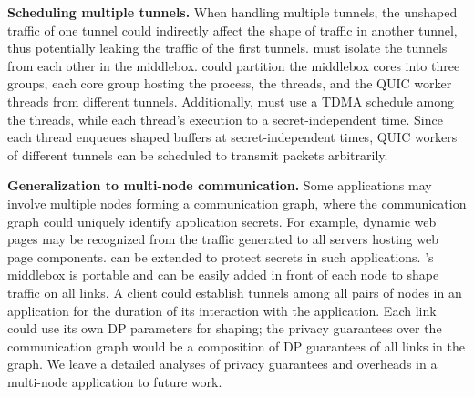 \textbf{Scheduling multiple tunnels.}
When handling multiple tunnels, the unshaped traffic of one tunnel could
indirectly affect the shape of traffic in another tunnel, thus potentially
leaking the traffic of the first tunnels.
{\sys} must isolate the tunnels from each other in the middlebox.
{\sys} could partition the middlebox cores into three groups, each core group
hosting the {\ushaper} process, the {\prepare} threads, and the QUIC worker
threads from different tunnels.
Additionally, {\sys} must use a TDMA schedule among the {\prepare} threads,
while  each thread's execution to a secret-independent time.
Since each {\prepare} thread enqueues shaped buffers at secret-independent
times, QUIC workers of different tunnels can be scheduled to transmit
packets arbitrarily.
%

\textbf{Generalization to multi-node communication.}
Some applications may involve multiple nodes forming a communication graph,
where the communication graph could uniquely identify application secrets.
For example, dynamic web pages may be recognized from the traffic generated to
all servers hosting web page components.
{\sys} can be extended to protect secrets in such applications.
{\sys}'s middlebox is portable and can be easily added in front
of each node to shape traffic on all links.
A client could establish tunnels among all pairs of nodes in an application for
the duration of its interaction with the application.
Each link could use its own DP parameters for shaping; the privacy
guarantees over the communication graph would be a composition of DP guarantees
of all links in the graph.
We leave a detailed analyses of privacy guarantees and overheads in a multi-node
application to future work.

